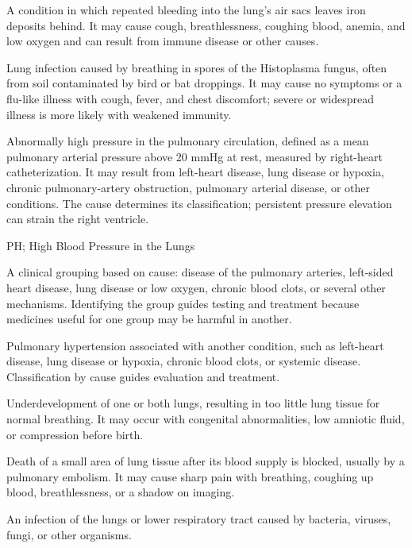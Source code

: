  A condition in which repeated bleeding into the lung’s air sacs leaves iron deposits behind. It may cause cough, breathlessness, coughing blood, anemia, and low oxygen and can result from immune disease or other causes.

 Lung infection caused by breathing in spores of
the Histoplasma fungus, often from soil contaminated by bird or bat droppings. It
may cause no symptoms or a flu-like illness with cough, fever, and chest discomfort;
severe or widespread illness is more likely with weakened immunity.

 Abnormally high pressure in the pulmonary circulation, defined as a mean pulmonary arterial pressure
above 20 mmHg at rest, measured by right-heart catheterization. It may result from left-heart disease, lung disease
or hypoxia, chronic pulmonary-artery obstruction, pulmonary arterial disease, or other conditions. The cause
determines its classification; persistent pressure elevation can strain the right ventricle.

\synonyms
PH; High Blood Pressure in the Lungs

 A clinical grouping based on cause: disease of the pulmonary arteries, left-sided heart disease, lung disease or low oxygen, chronic blood clots, or several other mechanisms. Identifying the group guides testing and treatment because medicines useful for one group may be harmful in another.

 Pulmonary hypertension associated with another condition, such as left-heart disease, lung disease or hypoxia, chronic blood clots, or systemic disease. Classification by cause guides evaluation and treatment.

 Underdevelopment of one or both lungs, resulting in too little lung tissue for normal breathing. It may occur with congenital abnormalities, low amniotic fluid, or compression before birth.

 Death of a small area of lung tissue after its blood supply is blocked, usually by a pulmonary embolism. It may cause sharp pain with breathing, coughing up blood, breathlessness, or a shadow on imaging.

 An infection of the lungs or lower respiratory tract caused by bacteria, viruses, fungi, or other organisms.

